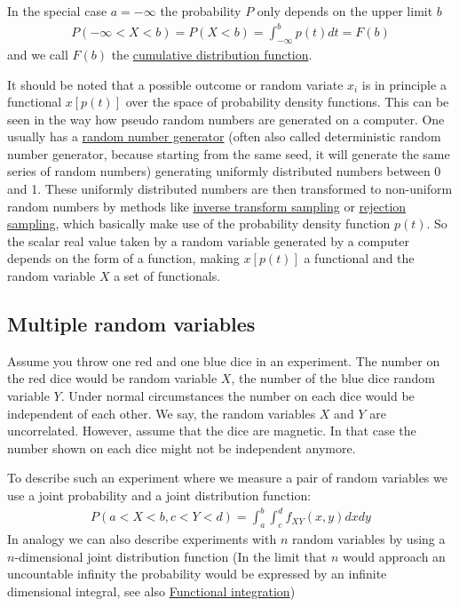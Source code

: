 In the special case $a=-\infty$ the probability $P$ only depends on
the upper limit $b$ 
\begin{align}
P(-\infty < X < b) = P(X < b) = \int_{-\infty}^b p(t) dt = F(b)  
\end{align} 
and we call $F(b)$ the
\href{https://en.wikipedia.org/wiki/Cumulative_distribution_function}{cumulative
distribution function}.

It should be noted that a possible outcome or random variate $x_i$ is
in principle a functional $x[p(t)]$ over the space of probability
density functions. This can be seen in the way how pseudo random numbers
are generated on a computer. One usually has a
\href{https://en.wikipedia.org/wiki/Pseudorandom_number_generator}{random
number generator} (often also called deterministic random number
generator, because starting from the same seed, it will generate the
same series of random numbers) generating uniformly distributed numbers
between 0 and 1. These uniformly distributed numbers are then
transformed to non-uniform random numbers by methods like
\href{https://en.wikipedia.org/wiki/Inverse_transform_sampling}{inverse
transform sampling} or
\href{https://en.wikipedia.org/wiki/Rejection_sampling}{rejection
sampling}, which basically make use of the probability density function
$p(t)$. So the scalar real value taken by a random variable generated
by a computer depends on the form of a function, making $x[p(t)]$ a
functional and the random variable $X$ a set of functionals.

\subsection{Multiple random variables}

Assume you throw one red and one blue dice in an experiment. The number
on the red dice would be random variable $X$, the number of the blue
dice random variable $Y$. Under normal circumstances the number on
each dice would be independent of each other. We say, the random
variables $X$ and $Y$ are uncorrelated. However, assume that the
dice are magnetic. In that case the number shown on each dice might not
be independent anymore.

To describe such an experiment where we measure a pair of random
variables we use a joint probability and a joint distribution function:
\begin{align}
P(a < X < b, c < Y < d) = \int_a^b\int_c^d f_{XY}(x,y) dx dy 
\end{align} 
In analogy we can also describe experiments with $n$ random
variables by using a $n$-dimensional joint distribution function (In
the limit that $n$ would approach an uncountable infinity the
probability would be expressed by an infinite dimensional integral, see
also
\href{https://en.wikipedia.org/wiki/Functional_integration}{Functional
integration})

